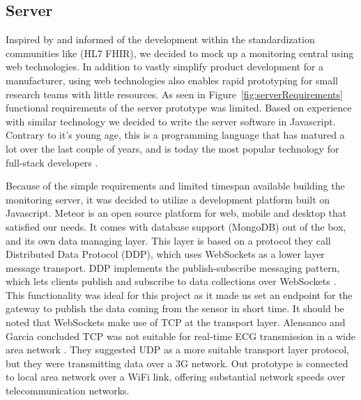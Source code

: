 \subsection{Server} %
\label{sub:server}

Inspired by \cite{Thelen:2014ew} and informed of the development within the standardization communities like (HL7 FHIR), we decided to mock up a monitoring central using web technologies. In addition to vastly simplify product development for a manufacturer, using web technologies also enables rapid prototyping for small research teams with little resources. As seen in Figure~\ref{fig:serverRequirements} functional requirements of the server prototype was limited. Based on experience with similar technology we decided to write the server software in Javascript. Contrary to it's young age, this is a programming language that has matured a lot over the last couple of years, and is today the most popular technology for full-stack developers \cite{so_survey_results}.

Because of the simple requirements and limited timespan available building the monitoring server, it was decided to utilize a development platform built on Javascript. Meteor \cite{meteor} is an open source platform for web, mobile and desktop that satisfied our needs. It comes with database support (MongoDB) out of the box, and its own data managing layer. This layer is based on a protocol they call Distributed Data Protocol (DDP), which uses WebSockets as a lower layer message transport. DDP implements the publish-subscribe messaging pattern, which lets clients publish and subscribe to data collections over WebSockets \cite{ddp_github}. This functionality was ideal for this project as it made us set an endpoint for the gateway to publish the data coming from the sensor in short time. It should be noted that WebSockets make use of TCP at the transport layer. Alensanco and Garcia concluded TCP was not suitable for real-time ECG transmission in a wide area network \cite{Alesanco:2010kc}. They suggested UDP as a more suitable transport layer protocol, but they were transmitting data over a 3G network. Out prototype is connected to local area network over a WiFi link, offering substantial network speeds over telecommunication networks.

